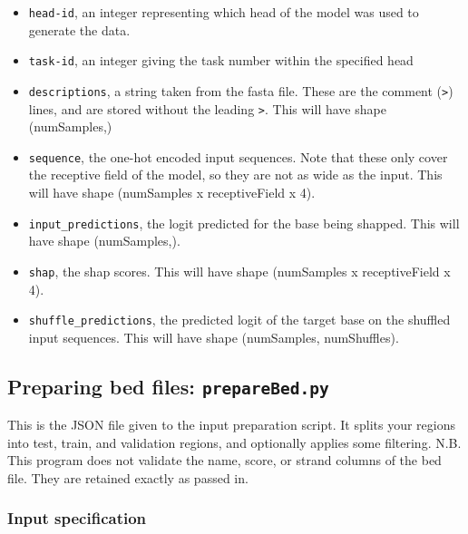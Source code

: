 \documentclass{article}
\begin{document}
\begin{itemize}
    \item \texttt{head-id}, an integer representing which head of the model was used to generate
        the data.
    \item \texttt{task-id}, an integer giving the task number within the specified head
    \item \texttt{descriptions}, a string taken from the fasta file. These are the comment
        (\texttt{>}) lines, and are stored without the leading \texttt{>}. This will
        have shape (numSamples,)
    \item \texttt{sequence}, the one-hot encoded input sequences. Note that these only cover
        the receptive field of the model, so they are not as wide as the input. This will have
        shape (numSamples x receptiveField x 4).
    \item \texttt{input\_predictions}, the logit predicted for the base being shapped.
        This will have shape (numSamples,).
    \item \texttt{shap}, the shap scores. This will have shape (numSamples x receptiveField x 4).
    \item \texttt{shuffle\_predictions}, the predicted logit of the target base on the shuffled
        input sequences. This will have shape (numSamples, numShuffles).
\end{itemize}




\newpage

\subsection{Preparing bed files: \texttt{prepareBed.py}}

This is the JSON file given to the input preparation script. It splits your regions into
test, train, and validation regions, and optionally applies some filtering.
N.B. This program does not validate the name, score, or strand columns of the bed file.
They are retained exactly as passed in.

\subsubsection{Input specification}
\end{document}
